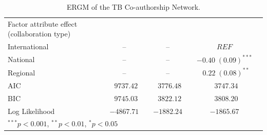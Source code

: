 \begin{table}
\begin{center}
\begin{tabular}{@{}lcclclcl@{}}
Factor attribute effect (collaboration type) &  &    &  &  &   &   \\
\hspace{10pt}International   &  & --   &  & --   &  & $REF$\\
\hspace{10pt}National        & &  --   &  &  -- & & $-0.40 \; (0.09)^{***}$ \\
\hspace{10pt}Regional        & &  --   &  & --  & & $\hspace{6pt}0.22 \; (0.08)^{**}$   \\
\midrule
AIC           &  & $\hspace{6pt}9737.42$  &  & $\hspace{6pt}3776.48$  &  & $\hspace{6pt}3747.34$ \\
BIC           &  & $\hspace{6pt}9745.03$  &  & $\hspace{6pt}3822.12$  &  & $\hspace{6pt}3808.20$ \\
Log Likelihood   &  & $-4867.71$        &  & $-1882.24$         &    & $-1865.67$ \\
\bottomrule
\multicolumn{4}{l}{\scriptsize{$^{***}p<0.001$, $^{**}p<0.01$, $^*p<0.05$}}
\end{tabular}
\caption{ERGM of the TB Co-authorship Network.}
\label{tab:tb_ergm}
\end{center}
\end{table}

